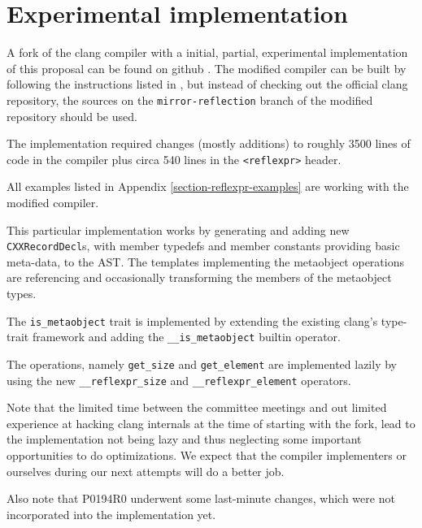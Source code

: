 \section{Experimental implementation}

A fork of the clang compiler with a initial, partial, experimental implementation
of this proposal can be found on github \cite{clang-reflexpr-impl}.
The modified compiler can be built by following the instructions listed
in \cite{clang-getting-started}, but instead of checking out the official clang
repository, the sources on the \texttt{mirror-reflection} branch of the modified
repository should be used.

The implementation required changes (mostly additions) to roughly 3500 lines
of code in the compiler plus circa 540 lines in the \texttt{<reflexpr>} header.

All examples listed in Appendix \ref{section-reflexpr-examples} are working with
the modified compiler.

This particular implementation works by generating and adding new \texttt{CXXRecordDecl}s,
with member typedefs and member constants providing basic meta-data, to the AST.
The templates implementing the metaobject operations are referencing and
occasionally transforming the members of the metaobject types.

The \texttt{is\_metaobject} trait is implemented by extending the existing
clang's type-trait framework and adding the \texttt{\_\_is\_metaobject} builtin
operator.

The  operations, namely \texttt{get\_size} and
\texttt{get\_element} are implemented lazily by using the new
\texttt{\_\_reflexpr\_size} and \texttt{\_\_reflexpr\_element} operators.

Note that the limited time between the committee meetings and out limited experience
at hacking clang internals at the time of starting with the fork,
lead to the implementation not being lazy and thus neglecting some important
opportunities to do optimizations. We expect that the compiler implementers
or ourselves during our next attempts will do a better job.

Also note that P0194R0 underwent some last-minute changes,
which were not incorporated into the implementation yet.
